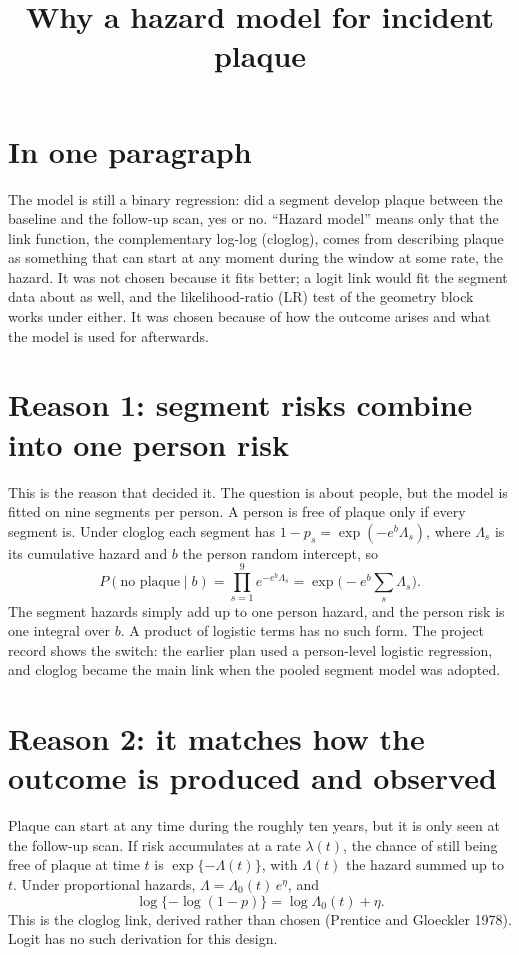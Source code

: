 \documentclass[11pt]{article}
\title{Why a hazard model for incident plaque}
\date{}
\begin{document}
\maketitle

\section*{In one paragraph}

The model is still a binary regression: did a segment develop plaque between
the baseline and the follow-up scan, yes or no. ``Hazard model'' means only
that the link function, the complementary log-log (cloglog), comes from
describing plaque as something that can start at any moment during the
window at some rate, the hazard. It was not chosen because it fits better; a
logit link would fit the segment data about as well, and the likelihood-ratio
(LR) test of the geometry block works under either. It was chosen because of
how the outcome arises and what the model is used for afterwards.

\section*{Reason 1: segment risks combine into one person risk}

This is the reason that decided it. The question is about people, but the
model is fitted on nine segments per person. A person is free of plaque only
if every segment is. Under cloglog each segment has
$1-p_s = \exp(-e^{b}\Lambda_s)$, where $\Lambda_s$ is its cumulative hazard and
$b$ the person random intercept, so
\[
  P(\text{no plaque} \mid b) = \prod_{s=1}^{9} e^{-e^{b}\Lambda_s}
  = \exp\!\Big(-e^{b}\sum_{s}\Lambda_s\Big).
\]
The segment hazards simply add up to one person hazard, and the person risk
is one integral over $b$. A product of logistic terms has no such form. The
project record shows the switch: the earlier plan used a person-level
logistic regression, and cloglog became the main link when the pooled
segment model was adopted.

\section*{Reason 2: it matches how the outcome is produced and observed}

Plaque can start at any time during the roughly ten years, but it is only
seen at the follow-up scan. If risk accumulates at a rate $\lambda(t)$, the
chance of still being free of plaque at time $t$ is
$\exp\{-\Lambda(t)\}$, with $\Lambda(t)$ the hazard summed up to $t$. Under
proportional hazards, $\Lambda = \Lambda_0(t)\,e^{\eta}$, and
\[
  \log\{-\log(1-p)\} = \log\Lambda_0(t) + \eta .
\]
This is the cloglog link, derived rather than chosen (Prentice and Gloeckler
1978). Logit has no such derivation for this design.
\end{document}
